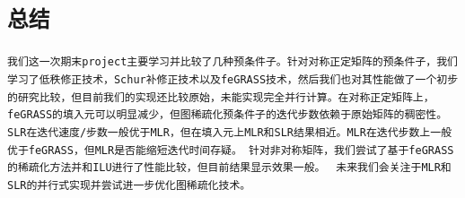 \documentclass[11pt, a4paper]{article}
\theoremstyle{plain}
\theoremstyle{plain}
\theoremstyle{plain}
\theoremstyle{definition}
\theoremstyle{remark}
\theoremstyle{definition}
\newcommand{\T}[1]{\texttt{#1}}
\begin{document}
\section*{\T{总结}}
\T{我们这一次期末project主要学习并比较了几种预条件子。针对对称正定矩阵的预条件子，我们学习了低秩修正技术，Schur补修正技术以及feGRASS技术，然后我们也对其性能做了一个初步的研究比较，但目前我们的实现还比较原始，未能实现完全并行计算。在对称正定矩阵上，feGRASS的填入元可以明显减少，但图稀疏化预条件子的迭代步数依赖于原始矩阵的稠密性。SLR在迭代速度/步数一般优于MLR，但在填入元上MLR和SLR结果相近。MLR在迭代步数上一般优于feGRASS，但MLR是否能缩短迭代时间存疑。 针对非对称矩阵，我们尝试了基于feGRASS的稀疏化方法并和ILU进行了性能比较，但目前结果显示效果一般。
}
\T{未来我们会关注于MLR和SLR的并行式实现并尝试进一步优化图稀疏化技术。}


\renewcommand{\refname}{\T{参考文献}}


\end{document}
